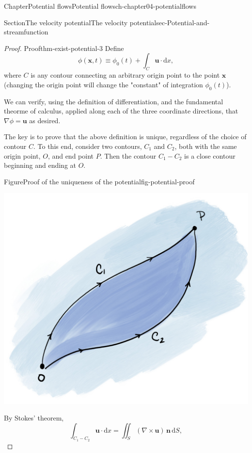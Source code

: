 \documentclass[oneside,10pt,]{book}
\numberwithin{equation}{section}
\newcommand{\de}{\mathrm{d}}
\newcommand{\bx}{\boldsymbol{x}}
\newcommand{\bn}{\boldsymbol{n}}
\newcommand{\bu}{\boldsymbol{u}}
\begin{document}
\begin{chapterptx}{Chapter}{Potential flows}{}{Potential flows}{}{}{ch-chapter04-potentialflows}
\begin{sectionptx}{Section}{The velocity potential}{}{The velocity potential}{}{}{sec-Potential-and-streamfunction}
\begin{introduction}{}
\begin{proof}{Proof}{}{thm-exist-potential-3}
Define%
\begin{equation*}
\phi(\bx, t) \equiv \phi_0(t) + \int_C \bu \cdot \de{x},
\end{equation*}
where \(C\) is any contour connecting an arbitrary origin point to the point \(\bx\) (changing the origin point will change the "constant" of integration \(\phi_0(t)\)).%
\par
We can verify, using the definition of differentiation, and the fundamental theorme of calculus, applied along each of the three coordinate directions, that \(\nabla \phi = \bu\) as desired.%
\par
The key is to prove that the above definition is unique, regardless of the choice of contour \(C\). To this end, consider two contours, \(C_1\) and \(C_2\), both with the same origin point, \(O\), and end point \(P\). Then the contour \(C_1 - C_2\) is a close contour beginning and ending at \(O\).%
\begin{figureptx}{Figure}{Proof of the uniqueness of the potential}{fig-potential-proof}{}%
\begin{image}{0.1}{0.8}{0.1}{}%
\includegraphics[width=\linewidth]{external/potentialproof.jpg}
\end{image}%
\tcblower
\end{figureptx}%
By Stokes' theorem,%
\begin{equation*}
\int_{C_1 - C_2} \bu \cdot \de{x} = \iint_S (\nabla \times \bu) \, \bn \, \de{S}, 

\end{equation*}
\end{proof}
\end{introduction}
\end{sectionptx}
\end{chapterptx}
\end{document}
